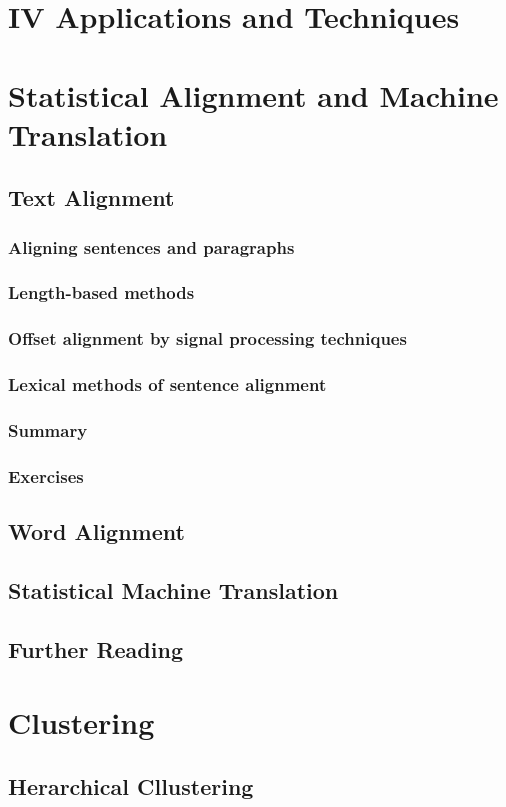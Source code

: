 \documentclass[a4paper]{article}
\begin{document}
\section*{IV Applications and Techniques}
\section{Statistical Alignment and Machine Translation}
\subsection{Text Alignment}
\subsubsection{Aligning sentences and paragraphs}
\subsubsection{Length-based methods}
\subsubsection{Offset alignment by signal processing techniques}
\subsubsection{Lexical methods of sentence alignment}
\subsubsection{Summary}
\subsubsection{Exercises}
\subsection{Word Alignment}
\subsection{Statistical Machine Translation}
\subsection{Further Reading}
\newpage
\section{Clustering}
\subsection{Herarchical Cllustering}
\end{document}
